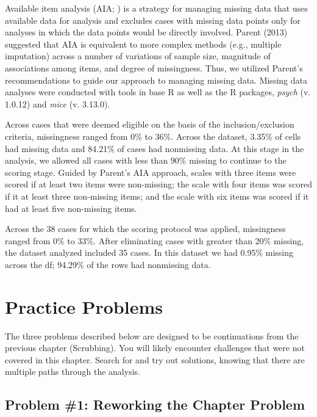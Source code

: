 \documentclass[
  english,
]{book}
\begin{document}
Available item analysis (AIA; \citep{parent_handling_2013}) is a strategy for managing missing data that uses available data for analysis and excludes cases with missing data points only for analyses in which the data points would be directly involved. Parent (2013) suggested that AIA is equivalent to more complex methods (e.g., multiple imputation) across a number of variations of sample size, magnitude of associations among items, and degree of missingness. Thus, we utilized Parent's recommendations to guide our approach to managing missing data. Missing data analyses were conducted with tools in base R as well as the R packages, \emph{psych} (v. 1.0.12) and \emph{mice} (v. 3.13.0).

Across cases that were deemed eligible on the basis of the inclusion/exclusion criteria, missingness ranged from 0\% to 36\%. Across the dataset, 3.35\% of cells had missing data and 84.21\% of cases had nonmissing data. At this stage in the analysis, we allowed all cases with less than 90\% missing to continue to the scoring stage. Guided by Parent's \citeyearpar{parent_handling_2013} AIA approach, scales with three items were scored if at least two items were non-missing; the scale with four items was scored if it at least three non-missing items; and the scale with six items was scored if it had at least five non-missing items.

Across the 38 cases for which the scoring protocol was applied, missingness ranged from 0\% to 33\%. After eliminating cases with greater than 20\% missing, the dataset analyzed included 35 cases. In this dataset we had 0.95\% missing across the df; 94.29\% of the rows had nonmissing data.

\hypertarget{practice-problems-1}{%
\section{Practice Problems}\label{practice-problems-1}}

The three problems described below are designed to be continuations from the previous chapter (Scrubbing). You will likely encounter challenges that were not covered in this chapter. Search for and try out solutions, knowing that there are multiple paths through the analysis.

\hypertarget{problem-1-reworking-the-chapter-problem}{%
\subsection{Problem \#1: Reworking the Chapter Problem}\label{problem-1-reworking-the-chapter-problem}}
\end{document}
